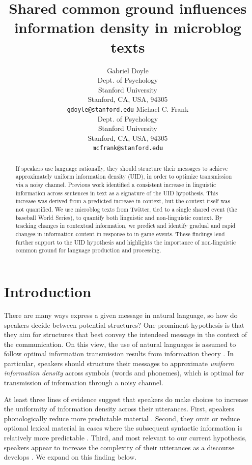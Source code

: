 \documentclass[11pt,letterpaper]{article}
\title{Shared common ground influences information density in microblog texts}
\author{Gabriel Doyle\\
Dept. of Psychology\\
Stanford University\\
Stanford, CA, USA, 94305\\
{\tt gdoyle@stanford.edu}
	  \And
          Michael C. Frank\\
Dept. of Psychology\\
Stanford University\\
Stanford, CA, USA, 94305\\
{\tt mcfrank@stanford.edu}
}
\date{}
\begin{document}
\maketitle
\begin{abstract}
If speakers use language rationally, they should structure their messages to achieve approximately uniform information density (UID), in order to optimize transmission via a noisy channel. Previous work identified a consistent increase in linguistic information across sentences in text as a signature of the UID hypothesis. This increase was derived from a predicted increase in context, but the context itself was not quantified. We use microblog texts from Twitter, tied to a single shared event (the baseball World Series), to quantify both linguistic and non-linguistic context. By tracking changes in contextual information, we predict and identify gradual and rapid changes in information content in response to in-game events. These findings lend further support to the UID hypothesis and highlights the importance of non-linguistic common ground for language production and processing.
\end{abstract}

\section{Introduction}

There are many ways express a given message in natural language, so how do speakers decide between potential structures? One prominent hypothesis is that they aim for structures that best convey the intendeed message in the context of the communication. On this view, the use of natural languages is assumed to follow optimal information transmission results from information theory \cite{shannon1948}. In particular, speakers should structure their messages to approximate \emph{uniform information density} across symbols (words and phonemes), which is optimal for transmission of information through a noisy channel. 

At least three lines of evidence suggest that speakers do make choices to increase the uniformity of information density across their utterances. First, speakers phonologically reduce more predictable material \cite{aylett2004,aylett2006,bell2003}. Second, they omit or reduce optional lexical material in cases where the subsequent syntactic information is relatively more predictable \cite{levy2007,frank2008,jaeger2010}. Third, and most relevant to our current hypothesis, speakers appear to increase the complexity of their utterances as a discourse develops \cite{genzel2002,genzel2003,qian2012}. We expand on this finding below.
\end{document}
